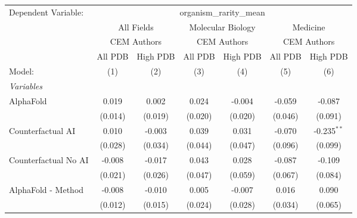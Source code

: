 \begingroup
\centering
\begin{tabular}{lcccccc}
   \tabularnewline \midrule \midrule
   Dependent Variable: & \multicolumn{6}{c}{organism\_rarity\_mean}\\
 & \multicolumn{2}{c}{All Fields} & \multicolumn{2}{c}{Molecular Biology} & \multicolumn{2}{c}{Medicine} \\
\cmidrule(lr){2-3} \cmidrule(lr){4-5} \cmidrule(lr){6-7}
 & \multicolumn{2}{c}{CEM Authors} & \multicolumn{2}{c}{CEM Authors} & \multicolumn{2}{c}{CEM Authors} \\
\cmidrule(lr){2-3} \cmidrule(lr){4-5} \cmidrule(lr){6-7}
 & \multicolumn{1}{c}{All PDB} & \multicolumn{1}{c}{High PDB} & \multicolumn{1}{c}{All PDB} & \multicolumn{1}{c}{High PDB} & \multicolumn{1}{c}{All PDB} & \multicolumn{1}{c}{High PDB} \\
\cmidrule(lr){2-2} \cmidrule(lr){3-3} \cmidrule(lr){4-4} \cmidrule(lr){5-5} \cmidrule(lr){6-6} \cmidrule(lr){7-7}
   Model:                                                     & (1)     & (2)          & (3)          & (4)         & (5)     & (6)\\  
   \midrule
   \emph{Variables}\\
   AlphaFold                                                  & 0.019   & 0.002        & 0.024        & -0.004      & -0.059  & -0.087\\   
                                                              & (0.014) & (0.019)      & (0.020)      & (0.020)     & (0.046) & (0.091)\\   
   Counterfactual AI                                          & 0.010   & -0.003       & 0.039        & 0.031       & -0.070  & -0.235$^{**}$\\   
                                                              & (0.028) & (0.034)      & (0.044)      & (0.047)     & (0.096) & (0.099)\\   
   Counterfactual No AI                                       & -0.008  & -0.017       & 0.043        & 0.028       & -0.087  & -0.109\\   
                                                              & (0.021) & (0.026)      & (0.047)      & (0.059)     & (0.067) & (0.084)\\   
   AlphaFold - Method                                         & -0.008  & -0.010       & 0.005        & -0.007      & 0.016   & 0.090\\   
                                                              & (0.012) & (0.015)      & (0.024)      & (0.028)     & (0.034) & (0.065)\\   

\end{tabular}
